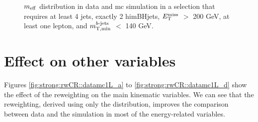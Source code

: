 \begin{figure}[htbp]
\centering
{}
\caption{$m_{\mathrm{eff}}$ distribution in data and \gls{mc} simulation in a selection that requires at least 4 jets, exactly 2 himBHjets, $E_{\rm T}^{\mathrm{miss}}$ $>$ 200 GeV,
at least one lepton, and $m_{\mathrm{T, min}}^{b\textrm{-jets}}$ $<$ 140 GeV.}
\label{fig:meff_in2b_no_corr}
\end{figure}



\section{Effect on other variables}

Figures \ref{fig:strong:rwCR::datamc1L_a} to \ref{fig:strong:rwCR::datamc1L_d}
show the effect of the reweighting on the main kinematic variables.
We can see that the reweighting, derived using only the \meff distribution, improves the 
comparison between data and the simulation 
in most of the energy-related variables.

